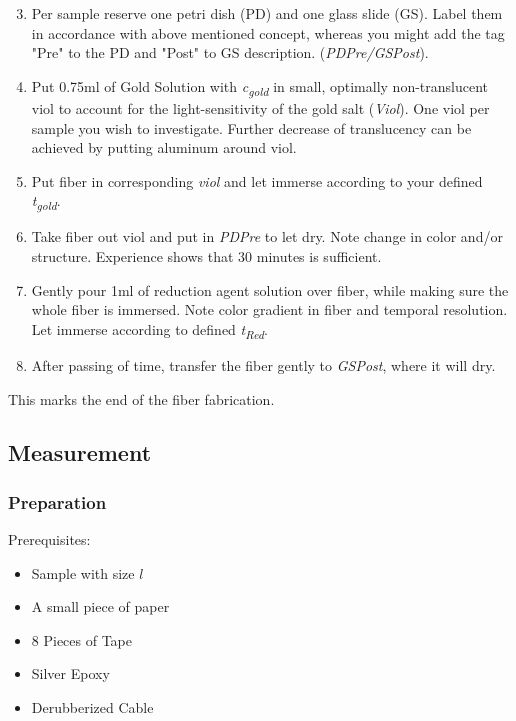 \begin{enumerate}
\setcounter{enumi}{2}
    
    \item Per sample reserve one petri dish (PD) and one glass slide (GS). Label them in accordance with above mentioned concept, whereas you might add the tag "Pre" to the PD and "Post" to GS description. (\textit{PDPre/GSPost}).
    
    \item Put 0.75ml of Gold Solution with \textit{c\textsubscript{gold}} in small, optimally non-translucent viol to account for the light-sensitivity of the gold salt (\textit{Viol}). One viol per sample you wish to investigate. Further decrease of translucency can be achieved by putting aluminum around viol.
    
    \item Put fiber in corresponding \textit{viol} and let immerse according to your defined \textit{t\textsubscript{gold}}.
    \item Take fiber out viol and put in \textit{PDPre} to let dry. Note change in color and/or structure. Experience shows that 30 minutes is sufficient.
    
    \item Gently pour 1ml of reduction agent solution over fiber, while making sure the whole fiber is immersed. Note color gradient in fiber and temporal resolution. Let immerse according to defined \textit{t\textsubscript{Red}}.
    
    \item After passing of time, transfer the fiber gently to \textit{GSPost}, where it will dry.
    \end{enumerate}
    
    \begin{center}
        This marks the end of the fiber fabrication.
    \end{center}

\subsection{Measurement}

\subsubsection{Preparation}
Prerequisites:
\begin{multicols}{2}
\begin{itemize}
    \item Sample with size $l$
    \item A small piece of paper
    \item 8 Pieces of Tape
    \item Silver Epoxy
    \item Derubberized Cable
\end{itemize}
\end{multicols}


